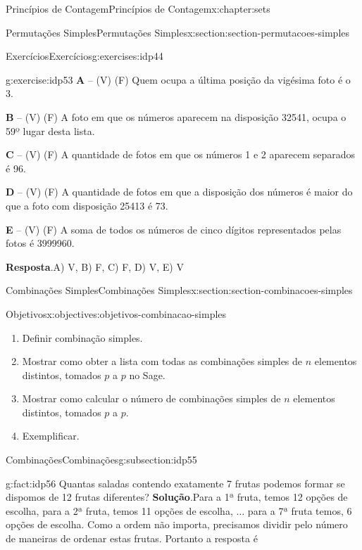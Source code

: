 \documentclass[oneside,10pt,]{book}
\newcommand{\blocktitlefont}{\relax}
\newcommand{\terminology}[1]{\textbf{#1}}
\numberwithin{equation}{section}
\begin{document}
\begin{chapterptx}{Princípios de Contagem}{}{Princípios de Contagem}{}{}{x:chapter:sets}
\begin{sectionptx}{Permutações Simples}{}{Permutações Simples}{}{}{x:section:section-permutacoes-simples}
\begin{exercises-subsection}{Exercícios}{}{Exercícios}{}{}{g:exercises:idp44}
\begin{divisionexercise}{5}{}{}{g:exercise:idp53}
\terminology{A} – (V) (F) Quem ocupa a última posição da vigésima foto é o 3.%
\par
\terminology{B} – (V) (F) A foto em que os números aparecem na disposição 32541, ocupa o 59º lugar desta lista.%
\par
\terminology{C} – (V) (F) A quantidade de fotos em que os números 1 e 2 aparecem separados é 96.%
\par
\terminology{D} – (V) (F) A quantidade de fotos em que a disposição dos números é maior do que a foto com disposição 25413 é 73.%
\par
\terminology{E} – (V) (F) A soma de todos os números de cinco dígitos representados pelas fotos é 3999960.%
\par\smallskip%
\noindent\textbf{\blocktitlefont Resposta}.\hypertarget{g:answer:idp54}{}\quad{}A) V, B) F, C) F, D) V, E) V%
\end{divisionexercise}%
\end{exercises-subsection}
\end{sectionptx}
%
%
\typeout{************************************************}
\typeout{************************************************}
%
\begin{sectionptx}{Combinações Simples}{}{Combinações Simples}{}{}{x:section:section-combinacoes-simples}
\begin{objectives}{Objetivos}{x:objectives:objetivos-combinacao-simples}
%
\begin{enumerate}
\item{}Definir combinação simples.%
\item{}Mostrar como obter a lista com todas as combinações simples de \(n\) elementos distintos, tomados \(p\) a \(p\) no Sage.%
\item{}Mostrar como calcular o número de combinações simples de \(n\) elementos distintos, tomados \(p\) a \(p\).%
\item{}Exemplificar.%
\end{enumerate}
\end{objectives}
%
%
\typeout{************************************************}
\typeout{************************************************}
%
\begin{subsectionptx}{Combinações}{}{Combinações}{}{}{g:subsection:idp55}
\begin{fact}{}{}{g:fact:idp56}%
Quantas saladas contendo exatamente 7 frutas podemos formar se dispomos de 12 frutas diferentes?%
\textbf{\blocktitlefont Solução}.\quad{}Para a 1ª fruta, temos 12 opções de escolha, para a 2ª fruta, temos 11 opções de escolha, \(\dots\) para a 7ª fruta temos, 6 opções de escolha. Como a ordem não importa, precisamos dividir pelo número de maneiras de ordenar estas frutas. Portanto a resposta é%

\end{fact}
\end{subsectionptx}
\end{sectionptx}
\end{chapterptx}
\end{document}
